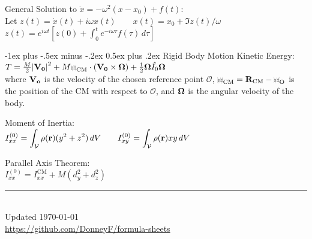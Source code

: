 \documentclass[12pt,landscape]{article}
\makeatletter
\renewcommand{\section}{\@startsection{section}{1}{0mm}%
                                {-1ex plus -.5ex minus -.2ex}%
                                {0.5ex plus .2ex}%
                                {\normalfont\normalsize\bfseries}}
\newcommand{\tab}{\hspace{.02\textwidth}}
\newcommand{\ds}{\displaystyle}
\renewcommand{\cross}{\times}
\def\rcurs{{\mbox{$\resizebox{.09in}{.08in}{\texttt{[image: ScriptR]}}$}}}
\makeatother
\begin{document}
\begin{multicols}{3}
General Solution to $\ddot{x} = -\omega^2 (x - x_0) + f(t)$:\\
\tab Let $z(t) = \dot{x}(t) + i\omega x(t) \qquad x(t) = x_0 + \Im{z(t)}/\omega$\\
\tab $\ds z(t) = e^{i\omega t}\left[z(0) + \int_{0}^{t} e^{-i\omega \tau} f(\tau)\,d\tau\right]$


\section{Rigid Body Motion}
Kinetic Energy:\\
\tab $T = \frac{M}{2}\abs{\vb{V_0}}^2 + M\vb{\rcurs}_\text{CM} \cdot (\vb{V_0} \cross \vb{\Omega}) + \frac{1}{2}\vb{\Omega}\hat{I_0}\vb{\Omega}$\\
where $\vb{V_o}$ is the velocity of the chosen reference point $\mathcal{O}$, $\vb{\rcurs}_\text{CM} = \vb{R}_\text{CM} - \vb{\rcurs}_\text{O}$ is the position of the CM with respect to $\mathcal{O}$, and $\vb{\Omega}$ is the angular velocity of the body.

Moment of Inertia:\\
\tab $\ds I_{xx}^{(0)} = \int_\mathcal{V} \rho(\vb{r}) (y^2 + z^2)\,dV \qquad I_{xy}^{(0)} = \int_\mathcal{V} \rho(\vb{r}) xy\,dV$

Parallel Axis Theorem:\\
\tab $I_{xx}^{(0)} = I_{xx}^{\text{CM}} + M(d_y^2 + d_z^2)$

\rule{0.3\linewidth}{0.25pt}
\scriptsize\\
Updated \today\\
\href{https://github.com/DonneyF/formula-sheets}{https://github.com/DonneyF/formula-sheets}
\end{multicols}
\end{document}

